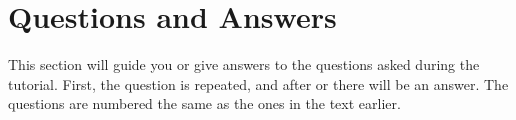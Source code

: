 \newpage
\section{Questions and Answers} \label{answers}


This section will guide you or give answers to the questions asked during the tutorial. First, the question is repeated, and after \cmd{-} or \cmd{:}  there will be an answer. The questions are numbered the same as the ones in the text earlier.


